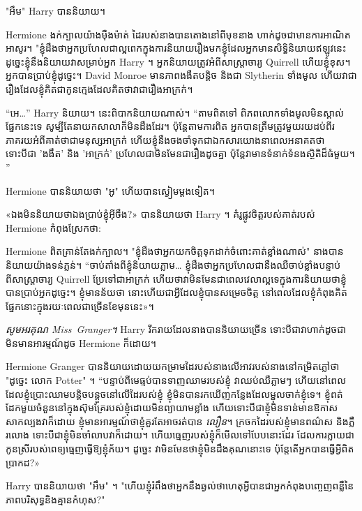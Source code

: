 "អឹម" Harry បាននិយាយ។

Hermione ងក់ក្បាលយ៉ាងម៉ឺងម៉ាត់ ដៃរបស់នាងបានតោងនៅពីមុខនាង ហាក់ដូចជាមានការអាណិតអាសូរ។ "ខ្ញុំដឹងថាអ្នកប្រហែលជាល្អពេកក្នុងការនិយាយរឿងមកខ្ញុំដែលអ្នកមានសិទ្ធិនិយាយឥឡូវនេះ ដូច្នេះខ្ញុំនឹងនិយាយវាសម្រាប់អ្នក Harry ។ អ្នកនិយាយត្រូវអំពីសាស្រ្តាចារ្យ Quirrell ហើយខ្ញុំខុស។ អ្នកបានប្រាប់ខ្ញុំដូច្នេះ។ David Monroe មានភាពងងឹតបន្តិច និងជា Slytherin ទាំងមូល ហើយវាជារឿងដែលខ្ញុំគិតជាកូនក្មេងដែលគិតថាវាជារឿងអាក្រក់។

“អេ…” Harry និយាយ។ នេះពិបាកនិយាយណាស់។ “តាមពិតទៅ ពិភពលោកទាំងមូលមិនស្គាល់ផ្នែកនេះទេ សូម្បីតែនាយកសាលាក៏មិនដឹងដែរ។ ប៉ុន្តែតាមការពិត អ្នកបានត្រឹមត្រូវមួយរយដប់ពីរភាគរយអំពីគាត់ថាជាមនុស្សអាក្រក់ ហើយខ្ញុំនឹងចងចាំទុកជាឯកសារយោងនាពេលអនាគតថា ទោះបីជា 'ងងឹត' និង 'អាក្រក់' ប្រហែលជាមិនមែនជារឿងដូចគ្នា ប៉ុន្តែវាមានទំនាក់ទំនងស្ថិតិដ៏ធំមួយ។ ”

Hermione បាននិយាយថា "អូ" ហើយបានស្ងៀមម្តងទៀត។

«ឯងមិននិយាយថាឯងប្រាប់ខ្ញុំអ៊ីចឹង?» បាននិយាយថា Harry ។ គំរូផ្លូវចិត្តរបស់គាត់របស់ Hermione កំពុងស្រែកថា: 

Hermione ពិតគ្រាន់តែងក់ក្បាល។ "ខ្ញុំដឹងថាអ្នកយកចិត្តទុកដាក់ចំពោះគាត់ខ្លាំងណាស់" នាងបាននិយាយយ៉ាងទន់ភ្លន់។ “ចាប់តាំងពីខ្ញុំនិយាយភ្លាម… ខ្ញុំដឹងថាអ្នកប្រហែលជានឹងឈឺចាប់ខ្លាំងបន្ទាប់ពីសាស្រ្តាចារ្យ Quirrell ប្រែទៅជាអាក្រក់ ហើយថាវាមិនមែនជាពេលវេលាល្អទេក្នុងការនិយាយថាខ្ញុំបានប្រាប់អ្នកដូច្នេះ។ ខ្ញុំមានន័យថា នោះហើយជាអ្វីដែលខ្ញុំបានសម្រេចចិត្ត នៅពេលដែលខ្ញុំកំពុងគិតផ្នែកនោះក្នុងរយៈពេលជាច្រើនខែមុននេះ»។

\emph{សូមអរគុណ Miss~Granger។} Harry រីករាយដែលនាងបាននិយាយច្រើន ទោះបីជាវាហាក់ដូចជាមិនមានអារម្មណ៍ដូច Hermione ក៏ដោយ។

Hermione Granger បាននិយាយដោយយកម្រាមដៃរបស់នាងលើអាវរបស់នាងនៅកម្រិតភ្លៅថា "ដូច្នេះ លោក Potter" ។ “បន្ទាប់ពីមេធ្មប់បានទាញឈាមរបស់ខ្ញុំ វាឈប់ឈឺភ្លាមៗ ហើយនៅពេលដែលខ្ញុំប្រោះឈាមបន្តិចបន្តួចនៅលើដៃរបស់ខ្ញុំ ខ្ញុំមិនបានរកឃើញកន្លែងដែលម្ជុលចាក់ខ្ញុំទេ។ ខ្ញុំពត់ដែកមួយចំនួននៅក្នុងស៊ុមគ្រែរបស់ខ្ញុំដោយមិនព្យាយាមខ្លាំង ហើយទោះបីជាខ្ញុំមិនទាន់មានឱកាសសាកល្បងវាក៏ដោយ ខ្ញុំមានអារម្មណ៍ថាខ្ញុំគួរតែអាចរត់បាន \emph{លឿន}។ ក្រចកដៃរបស់ខ្ញុំមានពណ៌ស និងភ្លឺរលោង ទោះបីជាខ្ញុំមិនចាំលាបវាក៏ដោយ។ ហើយ​ធ្មេញ​របស់​ខ្ញុំ​ក៏​មើល​ទៅ​បែប​នោះ​ដែរ ដែល​ការ​ក្លាយ​ជា​កូន​ស្រី​របស់​ពេទ្យ​ធ្មេញ​ធ្វើ​ឱ្យ​ខ្ញុំ​ភ័យ។ ដូច្នេះ វា​មិនមែន​ថា​ខ្ញុំ​មិន​ដឹងគុណ​នោះ​ទេ ប៉ុន្តែ​តើ​អ្នក​បាន​ធ្វើ​អ្វី​ពិតប្រាកដ​?»

Harry បាននិយាយថា "អឹម" ។ "ហើយ​ខ្ញុំ​រំពឹង​ថា​អ្នក​នឹង​ឆ្ងល់​ថា​ហេតុ​អ្វី​បាន​ជា​អ្នក​កំពុង​បញ្ចេញ​ពន្លឺ​នៃ​ភាព​បរិសុទ្ធ​និង​គ្មាន​កំហុស?"

